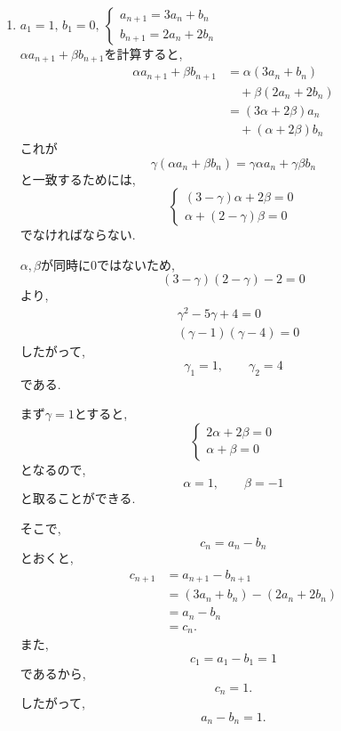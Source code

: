 \begin{enumerate}[label=(\arabic*),parsep=3pt]
\begin{enumerate}
                  また,\((1)-(2)\)をすると,
                  \[
                    2b_n=2\cdot4^{n-1}
                  \]
                  なので,
                  \[
                    b_n=4^{n-1}.
                  \]
          \end{enumerate}
    \item $\displaystyle a_1=1,\,b_1=0,\ \begin{cases}a_{n+1}=3a_n+b_n\\ b_{n+1}=2a_n+2b_n\end{cases}$\\
          $\alpha a_{n+1}+\beta b_{n+1}$を計算すると,
          \begin{align*}
            \alpha a_{n+1}+\beta b_{n+1}
              &=\alpha(3a_n+b_n)\\
              &\quad +\beta(2a_n+2b_n)\\
              &=(3\alpha+2\beta)a_n\\
              &\quad +(\alpha+2\beta)b_n
          \end{align*}
          これが
          \[
            \gamma(\alpha a_n+\beta b_n)
            =\gamma\alpha a_n+\gamma\beta b_n
          \]
          と一致するためには,
          \[
          \begin{cases}
            (3-\gamma)\alpha+2\beta=0\\
            \alpha+(2-\gamma)\beta=0
          \end{cases}
          \]
          でなければならない.

          $\alpha,\beta$が同時に$0$ではないため,
          \[
            (3-\gamma)(2-\gamma)-2=0
          \]
          より,
          \begin{align*}
            &\gamma^2-5\gamma+4=0\\
            &(\gamma-1)(\gamma-4)=0
          \end{align*}
          したがって,
          \[
            \gamma_1=1,\qquad\gamma_2=4
          \]
          である.

          まず$\gamma=1$とすると,
          \[
          \begin{cases}
            2\alpha+2\beta=0\\
            \alpha+\beta=0
          \end{cases}
          \]
          となるので,
          \[
            \alpha=1,\qquad\beta=-1
          \]
          と取ることができる.

          そこで,
          \[
            c_n=a_n-b_n
          \]
          とおくと,
          \begin{align*}
            c_{n+1}
              &=a_{n+1}-b_{n+1}\\
              &=(3a_n+b_n)-(2a_n+2b_n)\\
              &=a_n-b_n\\
              &=c_n.
          \end{align*}
          また,
          \[
            c_1=a_1-b_1=1
          \]
          であるから,
          \[
            c_n=1.
          \]
          したがって,
          \[
            a_n-b_n=1.
          \]


\end{enumerate}
